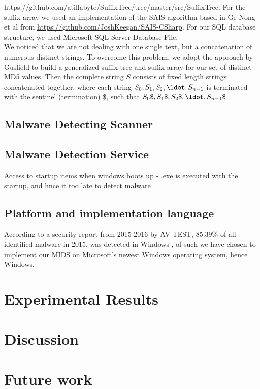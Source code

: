 \documentclass[12pt]{article} %
\begin{document}
{https://github.com/atillabyte/SuffixTree/tree/master/src/SuffixTree}. For the suffix array we used an implementation of the SAIS algorithm based in Ge Nong et al \cite{twoeffecient} from \href{https://github.com/JoshKeegan/SAIS-CSharp}{https://github.com/JoshKeegan/SAIS-CSharp}. For our SQL database structure, we used Microsoft SQL Server Database File. \\
We noticed that we are not dealing with one single text, but a concatenation of numerous distinct strings. To overcome this problem, we adopt the approach by Gusfield \cite{twoeffecient} to build a generalized suffix tree and suffix array for our set of distinct MD5 values. Then the complete string $S$ consists of fixed length strings concatenated together, where each string $S_0, S_1, S_2, \ldot, S_{n-1}$ is terminated with the sentinel (termination) \$, such that $S_0\$, S_1\$, S_2\$, \ldot, S_{n-1}\$$.


\subsection{Malware Detecting Scanner}


\subsection{Malware Detection Service}
Access to startup items when windows boots up - .exe is executed with the startup, and hnce it too late to detect malware

\subsection{Platform and implementation language}
According to a security report from 2015-2016 by AV-TEST, 85.39\% of all identified malware in 2015, was detected in Windows\® \cite{avtestreport }, of such we have chosen to implement our MIDS on Microsoft’s newest Windows \® operating system, hence Windows.  

\section{Experimental Results}

\section{Discussion}

\section{Future work}
\end{document}
